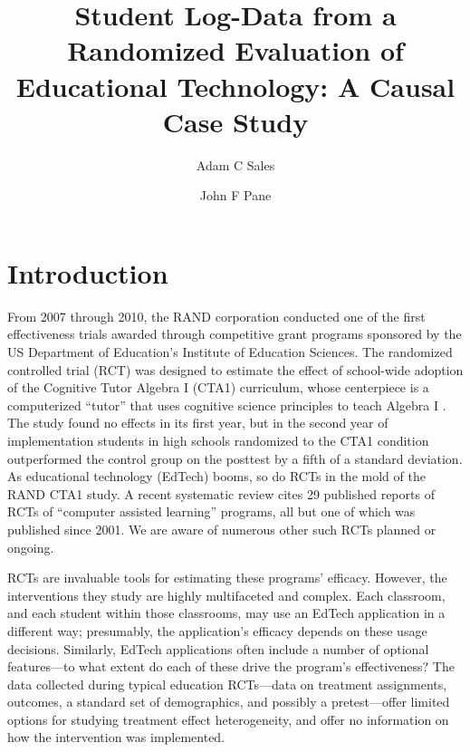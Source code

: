 \documentclass{article}\usepackage[]{graphicx}\usepackage[]{color}
\title{Student Log-Data from a Randomized Evaluation of Educational
  Technology: A Causal Case Study}
\author[1]{Adam C Sales}
\author[2]{John F Pane}
\affil[1]{University of Texas, Austin, TX}
\affil[2]{RAND Corporation, Pittsburgh, PA}
\begin{document}
\maketitle

\section{Introduction}
From 2007 through 2010, the RAND corporation
conducted one of the first effectiveness trials awarded through
competitive grant programs sponsored by the US Department of
Education's Institute of Education Sciences.  The randomized
controlled trial (RCT) was
designed to estimate the effect of school-wide adoption of the
Cognitive Tutor Algebra I (CTA1) curriculum, whose centerpiece is a
computerized ``tutor'' that uses cognitive science principles to teach
Algebra I \citep{anderson1985intelligent}.
The study \citep{pane2014effectiveness} found no effects in its first year, but in
the second year of implementation students in high schools randomized to
the CTA1 condition outperformed the control group on the posttest by a fifth of a
standard deviation.
As educational technology (EdTech) booms, so do RCTs in the mold of the RAND
CTA1 study. A recent systematic review \citep{escueta2017education} cites 29
published reports of RCTs of ``computer assisted learning'' programs,
all but one of which was published since 2001. We are aware of
numerous other such RCTs planned or ongoing.

RCTs are invaluable tools for estimating these programs'
efficacy. However, the interventions they study are highly
multifaceted and complex. Each classroom, and each student within
those classrooms, may use an EdTech application in a different way;
presumably, the application's efficacy depends on these usage
decisions.
Similarly, EdTech applications often include a number of optional
features---to what extent do each of these drive the program's
effectiveness?
The data collected during typical education RCTs---data on treatment
assignments, outcomes, a standard set of demographics, and possibly a
pretest---offer limited options for studying treatment effect
heterogeneity, and offer no information on how the intervention was
implemented.
\end{document}
